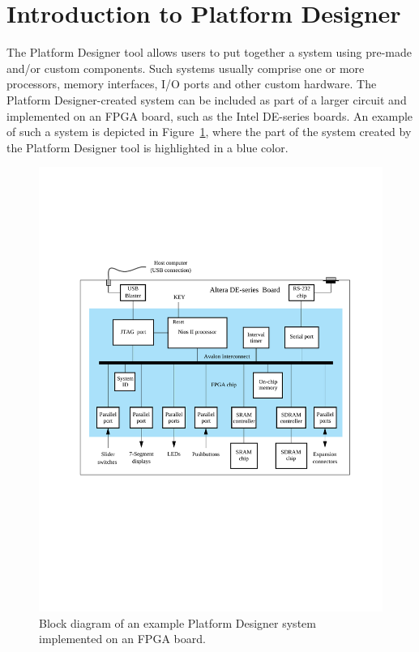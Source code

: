 \documentclass[11pt, twoside, pdftex]{article}
\begin{document}
\section{Introduction to Platform Designer}

The Platform Designer tool allows users to put together a system using pre-made and/or custom components. 
Such systems usually comprise one or more processors, memory interfaces, I/O ports and 
other custom hardware.  The Platform Designer-created system can be included as part of a larger circuit and 
implemented on an FPGA board, such as the Intel DE-series boards.
An example of such a system is depicted in Figure~\ref{fig:1}, where the part of the
system created by the Platform Designer tool is highlighted in a blue color.

\begin{figure}[h!]
   \begin{center}
        \includegraphics[width=6.5in]{figures/fig1.pdf}
   \end{center}
   \caption{Block diagram of an example Platform Designer system implemented on an FPGA board.}
	\label{fig:1}
\end{figure}
\end{document}
